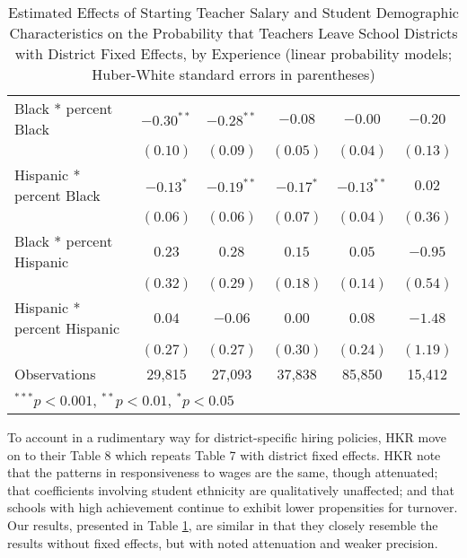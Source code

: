 \documentclass[]{article}
\begin{document}
\begin{table}
\begin{center}
\begin{tabular}{l c c c c c }
\quad Black * percent Black                 & $-0.30^{**}$ & $-0.28^{**}$ & $-0.08$       & $-0.00$      & $-0.20$       \\
                                            & $(0.10)$     & $(0.09)$     & $(0.05)$      & $(0.04)$     & $(0.13)$      \\
\quad Hispanic * percent Black              & $-0.13^{*}$  & $-0.19^{**}$ & $-0.17^{*}$   & $-0.13^{**}$ & $0.02$        \\
                                            & $(0.06)$     & $(0.06)$     & $(0.07)$      & $(0.04)$     & $(0.36)$      \\
\quad Black * percent Hispanic              & $0.23$       & $0.28$       & $0.15$        & $0.05$       & $-0.95$       \\
                                            & $(0.32)$     & $(0.29)$     & $(0.18)$      & $(0.14)$     & $(0.54)$      \\
\quad Hispanic * percent Hispanic           & $0.04$       & $-0.06$      & $0.00$        & $0.08$       & $-1.48$       \\
                                            & $(0.27)$     & $(0.27)$     & $(0.30)$      & $(0.24)$     & $(1.19)$      \\
\hline
Observations                                & 29,815        & 27,093        & 37,838         & 85,850        & 15,412         \\
\hline
\multicolumn{6}{l}{\scriptsize{$^{***}p<0.001$, $^{**}p<0.01$, $^*p<0.05$}}
\end{tabular}
\caption{Estimated Effects of Starting Teacher Salary and Student Demographic Characteristics on the Probability that Teachers Leave School Districts with District Fixed Effects, by Experience (linear probability models; Huber-White standard errors in parentheses)}
\label{tbl:reg_lpm_fe}
\end{center}
\end{table}

To account in a rudimentary way for district-specific hiring policies,
HKR move on to their Table 8 which repeats Table 7 with district fixed
effects. HKR note that the patterns in responsiveness to wages are the
same, though attenuated; that coefficients involving student ethnicity
are qualitatively unaffected; and that schools with high achievement
continue to exhibit lower propensities for turnover. Our results,
presented in Table \ref{tbl:reg_lpm_fe}, are similar in that they
closely resemble the results without fixed effects, but with noted
attenuation and weaker precision.
\end{document}
